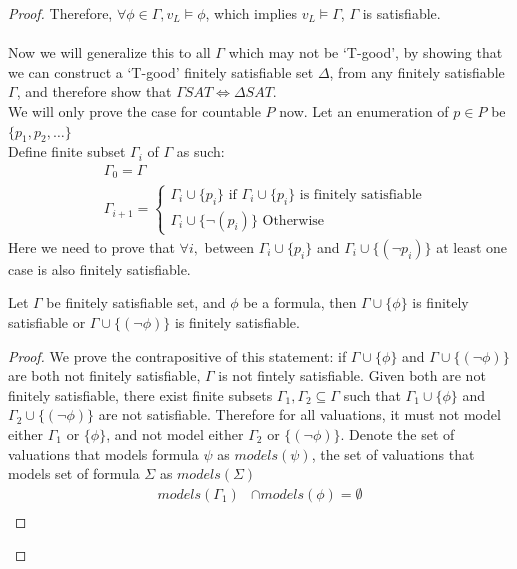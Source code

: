 \documentclass{article}
\newtheorem{theorem}{Theorem}[section]
\let\oldtheorem\theorem
\let\endoldtheorem\endtheorem
\renewenvironment{theorem}
  {\begin{tcolorbox}[
      colback=yellow!6,
      colframe=yellow!60!black,
      boxrule=0.6pt,
      arc=2pt,
      left=6pt,right=6pt,top=4pt,bottom=4pt,
      parbox=false
    ]\oldtheorem}
  {\endoldtheorem\end{tcolorbox}}
\begin{document}
\begin{proof}
    Therefore, $\forall \phi \in \Gamma, v_L \models \phi$, which implies $v_L \models \Gamma$, $\Gamma$ is satisfiable.\\\\
    Now we will generalize this to all $\Gamma$ which may not be `T-good', by showing that we can construct a `T-good' finitely satisfiable set
    $\Delta$, from any finitely satisfiable $\Gamma$, and therefore show that $\Gamma SAT \iff \Delta SAT$. \\
    We will only prove the case for countable $P$ now. Let an enumeration of $p \in P$ be $\{p_1, p_2, \dots\}$\\
    Define finite subset $\Gamma_i$ of $\Gamma$ as such: 
    \begin{align*}
        &\Gamma_0 = \Gamma\\
        &\Gamma_{i+1} = \begin{cases}
            \Gamma_i \cup \{p_i\} \text{ if } \Gamma_i \cup \{p_i\} \text{ is finitely satisfiable}\\
            \Gamma_i \cup \{\neg(p_i)\} \text{ Otherwise }
        \end{cases}
    \end{align*}
    Here we need to prove that $\forall i,$ between $ \Gamma_i \cup \{p_i\}$ and $\Gamma_i \cup \{(\neg p_i)\}$ at least one case is also finitely satisfiable.
    \begin{theorem}\label{lem:fsat_union}
    Let $\Gamma$ be finitely satisfiable set, and $\phi$ be a formula, then $\Gamma \cup \{\phi\}$ is finitely satisfiable or $\Gamma \cup \{(\neg \phi)\}$ 
    is finitely satisfiable.
    \end{theorem}
    \begin{proof}
        We prove the contrapositive of this statement: if $\Gamma \cup \{\phi\}$ and $\Gamma \cup \{(\neg \phi)\}$ are both not finitely satisfiable, $\Gamma$
        is not fintely satisfiable. Given both are not finitely satisfiable, there exist finite subsets $\Gamma_1, \Gamma_2 \subseteq \Gamma$ such that 
        $\Gamma_1 \cup \{\phi\}$ and $\Gamma_2 \cup \{(\neg \phi)\}$ are not satisfiable. Therefore for all valuations, it must not model either $\Gamma_1$ or $\{\phi\}$, and not model 
        either $\Gamma_2$ or $\{(\neg \phi)\}$. Denote the set of valuations that models formula $\psi$ as $models(\psi)$, the set of valuations that models set of formula $\Sigma$ as $models(\Sigma)$
        \begin{align*}
            models(\Gamma_1) &\cap models(\phi) = \emptyset\\

\end{align*}
\end{proof}
\end{proof}
\end{document}
